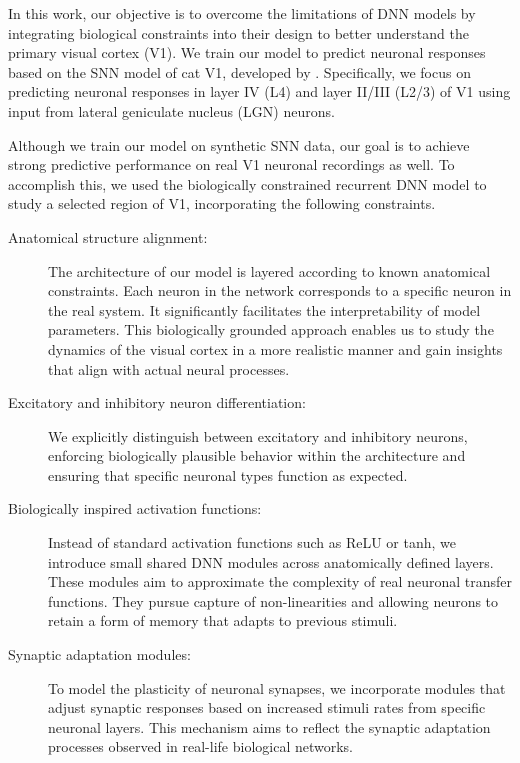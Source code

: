 In this work, our objective is to overcome the limitations of DNN models by
integrating biological constraints into their design to better understand the
primary visual cortex (V1). We train our model
to predict neuronal responses based on the SNN model of cat V1,
developed by \citet{antolik2024comprehensive}. Specifically, we
focus on predicting neuronal responses in layer IV (L4)
and layer II/III (L2/3) of V1 using input from
lateral geniculate nucleus (LGN) neurons. 

Although we train our model on synthetic SNN data,
our goal is to achieve strong predictive performance on real V1
neuronal recordings as well. To accomplish this, we used the biologically
constrained recurrent DNN model to study a selected region of V1,
incorporating the following constraints.

\begin{description}
\item[Anatomical structure alignment:] The architecture of our
model is layered according to known anatomical constraints. Each
neuron in the network corresponds to a specific neuron in the real
system. It significantly facilitates the interpretability of model
parameters. This biologically grounded approach enables us to study
the dynamics of the visual cortex in a more realistic manner and
gain insights that align with actual neural processes.

\item[Excitatory and inhibitory neuron differentiation:] We explicitly
distinguish between excitatory and inhibitory neurons, enforcing
biologically plausible behavior within the architecture and ensuring
that specific neuronal types function as expected.

\item[Biologically inspired activation functions:] Instead of standard
activation functions such as ReLU or tanh, we introduce small shared
DNN modules across anatomically defined layers. These modules aim to
approximate the complexity of real neuronal transfer functions. They
pursue capture of non-linearities and allowing neurons to retain a form
of memory that adapts to previous stimuli.

\item[Synaptic adaptation modules:] To model the plasticity of neuronal
synapses, we incorporate modules that adjust synaptic responses based on
increased stimuli rates from specific neuronal layers. This mechanism aims
to reflect the synaptic adaptation processes observed in real-life biological
networks.
\end{description}

